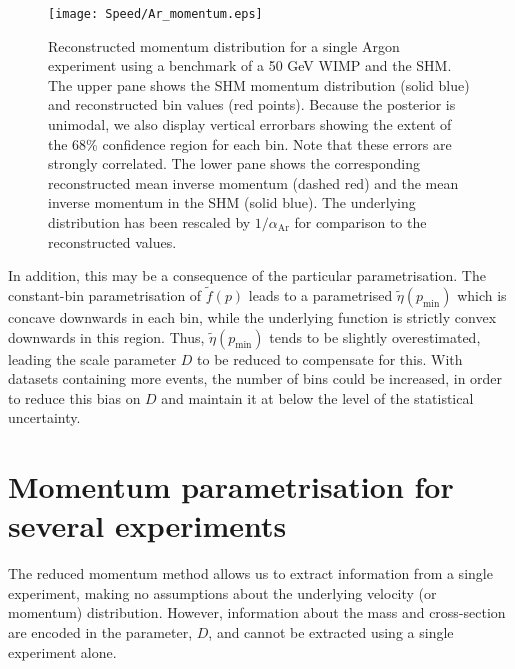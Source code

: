 \begin{figure}[t]
\centering
\texttt{[image: Speed/Ar\_momentum.eps]}
\caption[Reconstructed momentum distribution for a single Argon experiment using a benchmark of a 50 GeV WIMP and the SHM]{Reconstructed momentum distribution for a single Argon experiment using a benchmark of a 50 GeV WIMP and the SHM.  The upper pane shows the SHM momentum distribution (solid blue) and reconstructed bin values (red points). Because the posterior is unimodal, we also display vertical errorbars showing the extent of the 68\% confidence region for each bin. Note that these errors are strongly correlated. The lower pane shows the corresponding reconstructed mean inverse momentum (dashed red) and the mean inverse momentum in the SHM (solid blue). The underlying distribution has been rescaled by \(1/\alpha_{\textrm{Ar}}\) for comparison to the reconstructed values.}
  \label{fig:Speed/Ar_Momentum}
\end{figure}


In addition, this may be a consequence of the particular parametrisation. The constant-bin parametrisation of \(\tilde{f}(p)\) leads to a parametrised \(\tilde{\eta}(p_\textrm{min})\) which is concave downwards in each bin, while the underlying function is strictly convex downwards in this region. Thus, \(\tilde{\eta}(p_\textrm{min})\) tends to be slightly overestimated, leading the scale parameter \(D\) to be reduced to compensate for this. With datasets containing more events, the number of bins could be increased, in order to reduce this bias on \(D\) and maintain it at below the level of the statistical uncertainty.


\section{Momentum parametrisation for several experiments}
\label{sec:Speed:MomentumMethod2}

The reduced momentum method allows us to extract information from a single experiment, making no assumptions about the underlying velocity (or momentum) distribution. However, information about the mass and cross-section are encoded in the parameter, \(D\), and cannot be extracted using a single experiment alone.

